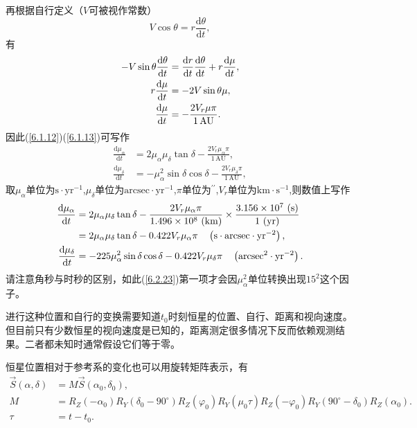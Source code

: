 \documentclass[11pt, a4paper, oneside]{ctexart}
\numberwithin{equation}{subsection}
\begin{document}
再根据自行定义（$V$可被视作常数）
\begin{equation}
V\cos\theta=r\frac{\mathrm{d}\theta}{\mathrm{d}t},
\end{equation}
有
\begin{align}
-V\sin\theta\frac{\mathrm{d}\theta}{\mathrm{d}t}&=\frac{\mathrm{d}r}{\mathrm{d}t}\frac{\mathrm{d}\theta}{\mathrm{d}t}+r\frac{\mathrm{d}\mu}{\mathrm{d}t},\notag\\
r\frac{\mathrm{d}\mu}{\mathrm{d}t}&=-2V\sin\theta\mu,\notag\\
\frac{\mathrm{d}\mu}{\mathrm{d}t}&=-\frac{2V_r\mu\pi}{1\,\mathrm{AU}}.
\end{align}
因此(\ref{6.1.12})(\ref{6.1.13})可写作
\begin{align}
\frac{\mathrm{d}\mu_\alpha}{\mathrm{d}t}&=2\mu_\alpha\mu_\delta\tan\delta-\frac{2V_r\mu_\alpha\pi}{1\,\mathrm{AU}},\\
\frac{\mathrm{d}\mu_\delta}{\mathrm{d}t}&=-\mu_\alpha^2\sin\delta\cos\delta-\frac{2V_r\mu_\delta\pi}{1\,\mathrm{AU}},
\end{align}
取$\mu_\alpha$单位为$\mathrm{s\cdot yr^{-1}}$,$\mu_\delta$单位为$\mathrm{arcsec\cdot yr^{-1}}$,$\pi$单位为$^{\prime\prime}$,$V_r$单位为$\mathrm{km\cdot{}s^{-1}}$,则数值上写作
\begin{align}
\frac{\mathrm{d}\mu_\alpha}{\mathrm{d}t}&=2\mu_\alpha\mu_\delta\tan\delta-\frac{2V_r\mu_\alpha\pi}{\rm 1.496\times10^8\,\left(\mathrm{km}\right)}\times\frac{3.156\times10^7\,\left(\mathrm{s}\right)}{1\,\left(\mathrm{yr}\right)}\\
&=2\mu_\alpha\mu_\delta\tan\delta-0.422V_r\mu_\alpha\pi\quad\left(\mathrm{s\cdot arcsec\cdot yr^{-2}}\right),\\
\frac{\mathrm{d}\mu_\delta}{\mathrm{d}t}&=-225\mu_\alpha^2\sin\delta\cos\delta-0.422V_r\mu_\delta\pi\quad\left(\mathrm{arcsec^{2}\cdot yr^{-2}}\right).\label{6.2.23}
\end{align}
请注意角秒与时秒的区别，如此(\ref{6.2.23})第一项才会因$\mu_{\alpha}^{2}$单位转换出现$15^{2}$这个因子。

进行这种位置和自行的变换需要知道$t_0$时刻恒星的位置、自行、距离和视向速度。但目前只有少数恒星的视向速度是已知的，距离测定很多情况下反而依赖观测结果。二者都未知时通常假设它们等于零。

恒星位置相对于参考系的变化也可以用旋转矩阵表示，有
\begin{align}
\vec S\left(\alpha,\delta\right)&=M\vec S\left(\alpha_0,\delta_0\right),\\
M&=R_Z\left(-\alpha_0\right)R_Y\left(\delta_0-90^\circ\right)R_Z\left(\varphi_0\right)R_Y\left(\mu_0\tau\right)R_Z\left(-\varphi_0\right)R_Y\left(90^\circ-\delta_0\right)R_Z\left(\alpha_0\right).\\
\tau&=t-t_{0}.
\end{align}
\end{document}
